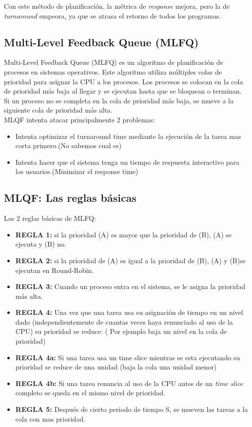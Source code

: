 \documentclass[../main.tex]{subfiles}
\begin{document}
            Con este método de planificación, la métrica de \textit{response} mejora, pero la de \textit{turnaround} empeora, ya que se atrasa el retorno de todos los programas.

    \subsection*{Multi-Level Feedback Queue (MLFQ)}
        Multi-Level Feedback Queue (MLFQ) es un algoritmo de planificación de procesos en sistemas operativos. Este algoritmo utiliza múltiples colas de prioridad para asignar la CPU a los procesos. Los procesos se colocan en la cola de prioridad más baja al llegar y se ejecutan hasta que se bloquean o terminan. Si un proceso no se completa en la cola de prioridad más baja, se mueve a la siguiente cola de prioridad más alta.\\

        MLQF intenta atacar principalmente 2 problemas:
        \begin{itemize}
            \item Intenta optimizar el turnaround time mediante la ejecución de la tarea mas corta primero.(No sabemos cual es)
            \item Intenta hacer que el sistema tenga un tiempo de respuesta interactivo para los usuarios.(Minimizar el response time)
        \end{itemize}

    \subsection*{MLQF: Las reglas básicas}
        Las 2 reglas básicas de MLFQ:
        \begin{itemize}
            \item \textbf{REGLA 1:} si la prioridad (A) es mayor que la prioridad de (B), (A) se ejecuta y (B) no.
            \item \textbf{REGLA 2:} si la prioridad de (A) es igual a la prioridad de (B), (A) y (B)se ejecutan en Round-Robin.
            \item \textbf{REGLA 3:} Cuando un proceso entra en el sistema, se le asigna la prioridad más alta.
            \item \textbf{REGLA 4:} Una vez que una tarea usa su asignación de tiempo en un nivel dado (independientemente de cuantas veces haya renunciado al uso de la CPU) su prioridad se reduce: ( Por ejemplo baja un nivel en la cola de prioridad)
            \item \textbf{REGLA 4a:} Si una tarea usa un time slice mientras se esta ejecutando su prioridad se reduce de una unidad (baja la cola una unidad menor)
            \item \textbf{REGLA 4b:} Si una tarea renuncia al uso de la CPU antes de un \textit{time slice} completo se queda en el mismo nivel de prioridad.
            \item \textbf{REGLA 5:} Después de cierto periodo de tiempo S, se mueven las tareas a la cola con mas prioridad.
        \end{itemize}
\end{document}
